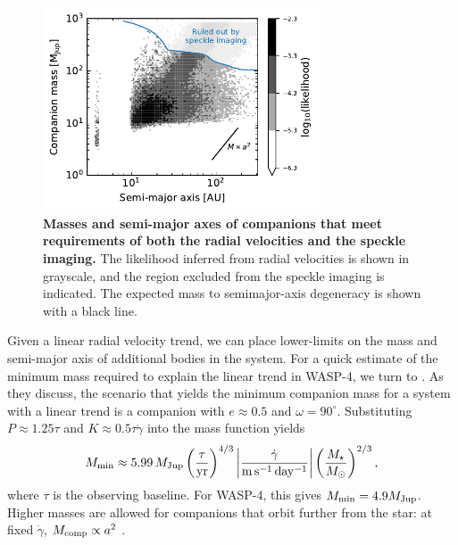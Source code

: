 \documentclass[12pt,twocolumn,tighten]{aastex62}
\begin{document}
\begin{figure}[t]
	\begin{center}
		\leavevmode
		\includegraphics[width=0.73\textwidth]{f4.pdf}
	\end{center}
	\vspace{-0.6cm}
	\caption{
    {\bf Masses and semi-major axes of companions that meet
    requirements of both the radial velocities and the speckle
    imaging.} The likelihood inferred from radial velocities is shown
    in grayscale, and the region excluded from the speckle imaging is
    indicated.  The expected mass to semimajor-axis degeneracy is
    shown with a black line.
	\label{fig:mass_sma}
  \vspace{-0cm}
	}
\end{figure}


Given a linear radial velocity trend, we can place lower-limits on the
mass and semi-major axis of additional bodies in the system.  For a
quick estimate of the minimum mass required to explain the linear
trend in WASP-4, we turn to \citet{feng_california_2015}.  As they
discuss, the scenario that yields the minimum companion mass for a
system with a linear trend is a companion with $e\approx0.5$ and
$\omega=90^\circ$.  Substituting $P\approx 1.25\tau$ and $K \approx
0.5\tau \dot{\gamma}$ into the mass function \citep[{\it
e.g.},][]{wright_efficient_2009} yields
\begin{equation}
 M_{\rm min} \approx 5.99\,M_{\rm Jup}
  \left( \frac{\tau}{{\rm yr}} \right)^{4/3}
  \left| \frac{\dot{\gamma}}{{\rm m\,s^{-1}\,day^{-1}}} \right|
  \left( \frac{M_\star}{{M_\odot}} \right)^{2/3},
\end{equation}
where $\tau$ is the observing baseline.  For WASP-4, this gives
$M_{\rm min} = 4.9 M_{\rm Jup}$.  Higher masses are allowed for
companions that orbit further from the star: at fixed $\dot{\gamma}$,
$M_{\rm comp} \propto a^2$
\citep{torres_substellar_1999,liu_crossing_2002}.
\end{document}
